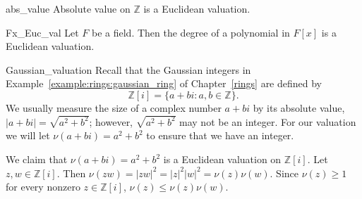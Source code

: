 \begin{example}{abs_value}
Absolute value on ${\mathbb Z}$ is a Euclidean valuation.
\end{example}


\begin{example}{Fx_Euc_val}
Let $F$ be a field. Then the degree of a polynomial in $F[x]$ is a Euclidean valuation. 
\end{example}


\begin{example}{Gaussian_valuation}
Recall that the Gaussian integers in Example~\ref{example:rings:gaussian_ring} of Chapter~\ref{rings} are defined by
\[
{\mathbb Z}[i] = \{  a + b i : a, b \in {\mathbb Z} \}.
\]
We usually measure the size of a complex number $a + bi$ by its absolute value, $|a + bi| = \sqrt{ a^2 + b^2}$; however, $\sqrt{a^2 + b^2}$ may not be an integer. For our valuation we will let $\nu(a + bi) = a^2 + b^2$ to ensure that we have an integer.  

We claim that $\nu( a+ bi) = a^2 + b^2$ is a Euclidean valuation on ${\mathbb Z}[i]$. Let $z, w \in {\mathbb Z}[i]$.  Then $\nu( zw) = |zw|^2 =
|z|^2 |w|^2  = \nu(z) \nu(w)$.  Since $\nu(z) \geq 1$ for every nonzero $z \in {\mathbb Z}[i]$, $\nu( z) \leq \nu(z) \nu(w)$.



\end{example}
